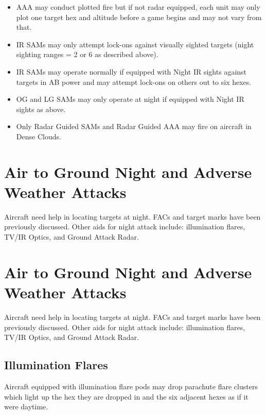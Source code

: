 \begin{advancedrules}
\begin{itemize}
        \item AAA may conduct plotted fire but if not radar equipped, each unit may only plot one target hex and altitude before a game begins and may not vary from that.

        \item IR SAMs may only attempt lock-ons against visually sighted targets (night sighting ranges = 2 or 6 as described above).

        \item IR SAMs may operate normally if equipped with Night IR sights against targets in AB power and may attempt lock-ons on others out to six hexes.

        \item OG and LG SAMs may only operate at night if equipped with Night IR sights as above.

        \item Only Radar Guided SAMs and Radar Guided AAA may fire on aircraft in Dense Clouds.

    \end{itemize}

    \section{Air to Ground Night and Adverse Weather Attacks}

    Aircraft need help in locating targets at night. FACs and target marks have been previously discussed. Other aids for night attack include: illumination flares, TV/IR Optics, and Ground Attack Radar.

    \section{Air to Ground Night and Adverse Weather Attacks}

    Aircraft need help in locating targets at night. FACs and target marks have been previously discussed. Other aids for night attack include: illumination flares, TV/IR Optics, and Ground Attack Radar.

    \subsection{Illumination Flares}

    Aircraft equipped with illumination flare pods may drop parachute flare clusters which light up the hex they are dropped in and the six adjacent hexes as if it were daytime.


\end{advancedrules}
